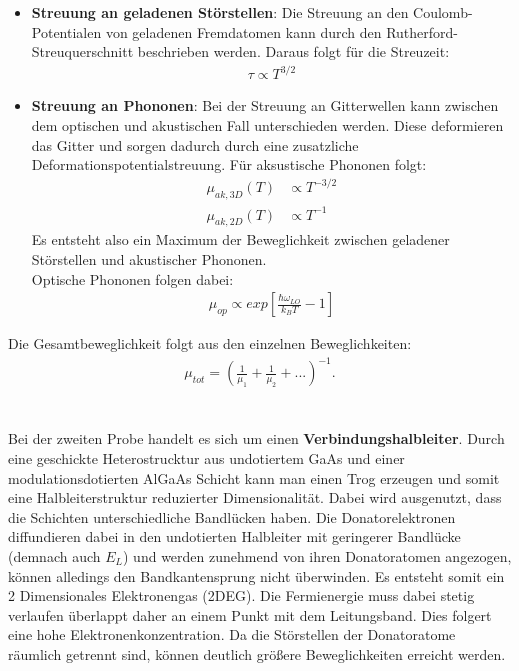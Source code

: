 \begin{itemize}
    \item \textbf{Streuung an geladenen Störstellen}:
    Die Streuung an den Coulomb-Potentialen von geladenen Fremdatomen kann durch den Rutherford-Streuquerschnitt beschrieben werden. Daraus folgt für die Streuzeit:
    \begin{align}
        \tau \propto T^{3/2}
    \end{align}
    \item \textbf{Streuung an Phononen}:
    Bei der Streuung an Gitterwellen kann zwischen dem optischen und akustischen Fall unterschieden werden. Diese deformieren das Gitter und sorgen dadurch durch eine zusatzliche Deformationspotentialstreuung. Für aksustische Phononen folgt:
\begin{align}
    \mu_{ak,3D}(T) &\propto T^{-3/2} \\
    \mu_{ak,2D}(T) &\propto T^{-1}
\end{align}
Es entsteht also ein Maximum der Beweglichkeit zwischen geladener Störstellen und akustischer Phononen.\\
Optische Phononen folgen dabei:
\begin{align}
    \mu_{op} \propto exp\left [\frac{\hbar \omega_{LO}}{k_B T} -1 \right]
\end{align}

\end{itemize}
Die Gesamtbeweglichkeit folgt aus den einzelnen Beweglichkeiten:
\begin{align}
    \mu_{tot} = \left (\frac{1}{\mu_1} +\frac{1}{\mu_2} + ...\right )^{-1}.
\end{align}
\\
\\
Bei der zweiten Probe handelt es sich um einen \textbf{Verbindungshalbleiter}. Durch eine geschickte Heterostrucktur aus undotiertem GaAs und einer modulationsdotierten AlGaAs Schicht kann man einen Trog erzeugen und somit eine Halbleiterstruktur reduzierter Dimensionalität. Dabei wird ausgenutzt, dass die Schichten unterschiedliche Bandlücken haben. Die Donatorelektronen diffundieren dabei in den undotierten Halbleiter mit geringerer Bandlücke (demnach auch $E_L$) und werden zunehmend von ihren Donatoratomen angezogen, können alledings den Bandkantensprung nicht überwinden. Es entsteht somit ein 2 Dimensionales Elektronengas (2DEG). Die Fermienergie muss dabei stetig verlaufen überlappt daher an einem Punkt mit dem Leitungsband. Dies folgert eine hohe Elektronenkonzentration. Da die Störstellen der Donatoratome räumlich getrennt sind, können deutlich größere Beweglichkeiten erreicht werden. 





